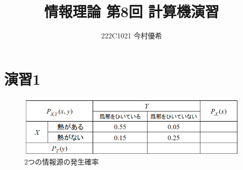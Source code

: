 \documentclass[documentclass]{jsarticle}
\begin{document}
\title{情報理論 第8回 計算機演習}
\author{222C1021 今村優希}
\maketitle

\newpage

\section*{演習1}

\begin{figure}[H]
  \begin{center}
    \includegraphics*[scale=0.5]{figure/1-1.png}
  \end{center}
  \caption{2つの情報源の発生確率}
  \label{fig:1-1}
\end{figure}
\end{document}
